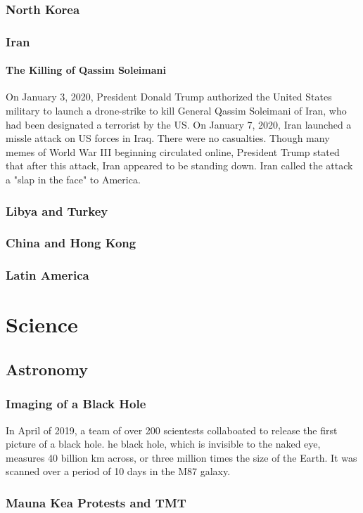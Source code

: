 			\subsubsection{North Korea}
			\subsubsection{Iran}
				\paragraph{The Killing of Qassim Soleimani}
				On January 3, 2020, President Donald Trump authorized the United States military to launch a drone-strike to kill General Qassim Soleimani of Iran, who had been designated a terrorist by the US.  On January 7, 2020, Iran launched a missle attack on US forces in Iraq.  There were no casualties.  Though many memes of World War III beginning circulated online, President Trump stated that after this attack, Iran appeared to be standing down.  Iran called the attack a "slap in the face" to America.  
			\subsubsection{Libya and Turkey}
			\subsubsection{China and Hong Kong}
			\subsubsection{Latin America}
	\section{Science}
		\subsection{Astronomy}
			\subsubsection{Imaging of a Black Hole}
			In April of 2019, a team of over 200 scientests collaboated to release the first picture of a black hole.  he black hole, which is invisible to the naked eye, measures 40 billion km across, or three million times the size of the Earth.  It was scanned over a period of 10 days in the M87 galaxy.  
			
			\subsubsection{Mauna Kea Protests and TMT}
			

